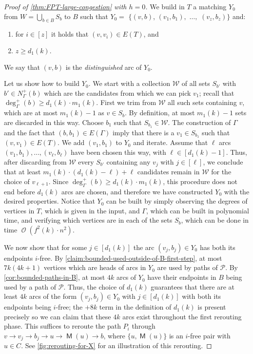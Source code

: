 \documentclass[a4paper,UKenglish,cleveref, autoref, thm-restate]{lipics-v2021}
\DeclareMathOperator{\Ocal}{\mathcal{O}\xspace}
\DeclareMathOperator{\Mat}{\mathsf M}
\begin{document}
\begin{proof}[Proof of \autoref{thm:FPT-large-congestion} with $h = 0$]
We build in $T$ a matching $Y_0$ from $W = \bigcup_{b \in B}S_b$ to $B$ such that $Y_0 =$ $\{(v, b)$, $(v_1, b_1),$ $\ldots,$ $(v_z, b_z)\}$ and:
\begin{enumerate}
\item for $i \in [z]$ it holds that $(v, v_i) \in E(T)$, and
\item $z \geq d_1(k)$. 
\end{enumerate}
We say that $(v, b)$ is the \emph{distinguished} arc of $Y_0$.

Let us show how to build $Y_0$.
We start with a collection $\mathcal{W}$ of all sets $S_{b'}$ with $b' \in N^+_{\Gamma}(b)$ which are the candidates from which we can pick $v_1$; recall that $\deg^+_\Gamma(b) \geq d_1(k)\cdot m_1(k)$.
First we trim from $\mathcal{W}$ all such sets containing $v$, which are at most $m_1(k) - 1$ as $v \in S_b$.
By definition, at most $m_1(k)-1$ sets are discarded in  this way. Choose $b_1$ such that $S_{b_1} \in \mathcal{W}$.
The construction of $\Gamma$ and the fact that $(b,b_1) \in E(\Gamma)$ imply that there is a $v_1 \in S_{b_1}$ such that $(v, v_1) \in E(T)$.
We add $(v_1, b_1)$ to $Y_0$ and iterate.
Assume that $\ell$ arcs $(v_1, b_1), \ldots, (v_\ell, b_\ell)$ have been chosen this way, with $\ell \in [d_1(k) - 1]$.
Thus, after discarding from $\mathcal{W}$ every $S_{b'}$ containing any $v_j$ with $j \in [\ell]$, we conclude that at least $m_1(k) \cdot (d_1(k) - \ell) + \ell$ candidates remain in $\mathcal{W}$ for the choice of $v_{\ell+1}$.
Since $\deg^+_{\Gamma}(b) \geq d_1(k) \cdot m_1(k)$, this procedure does not end before $d_1(k)$ arcs are chosen, and therefore we have constructed $Y_0$ with the desired properties.
Notice that $Y_0$ can be built by simply observing the degrees of vertices in $T$, which is given in the input, and $\Gamma$, which can be built in polynomial time, and verifying which vertices are in each of the sets $S_b$, which can be done in time $\Ocal(f^2(k) \cdot n^2)$.

We now show that for some $j \in [d_1(k)]$ the arc $(v_j,b_j) \in Y_0$ has both its endpoints $i$-free.
By \autoref{claim:bounded-used-outside-of-B-first-step}, at most $7k(4k+1)$ vertices which are heads of arcs in $Y_0$ are used by paths of $\mathcal{P}$.
By \autoref{cor:bounded-paths-in-B}, at most $4k$ arcs of $Y_0$ have their endpoints in $B$ being used by a path of $\mathcal{P}$.
Thus, the choice of $d_1(k)$ guarantees that there are at least $4k$ arcs of the form $(v_j, b_j) \in Y_0$ with $j \in [d_1(k)]$ with both its endpoints being $i$-free; the $+8k$ term in the definition of $d_1(k)$ is present precisely so we can claim that these $4k$ arcs exist throughout the first rerouting phase.
This suffices to reroute the path $P_i$ through $v \to v_j \to b_j \to u \to \Mat(u) \to b$, where $\{u, \Mat(u)\}$ is an $i$-free pair with $u \in C$.
See \autoref{fig:rerouting-for-X} for an illustration of this rerouting.


\end{proof}
\end{document}

